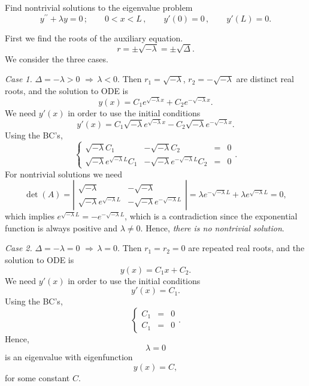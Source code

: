 \documentclass[11pt]{article}
\begin{document}
\begin{problem}
Find nontrivial solutions to the eigenvalue problem
\begin{equation*}
y^{\prime \prime} + \lambda y =0\,; \qquad  0<x<L \,, \qquad y'(0)=0  \,,\qquad y'(L) =0. 
\end{equation*}
\end{problem}
\begin{solution}
First we find the roots of the auxiliary equation.
\[r=\pm\sqrt{-\lambda}=\pm\sqrt{\Delta}.\]
We consider the three cases.\\

\par \textsl{Case 1.} $\Delta = -\lambda >0 \,\, \Rightarrow \, \lambda<0.$ Then $r_{1}=\sqrt{-\lambda}$, $r_{2}=-\sqrt{-\lambda}$ are distinct real roots, and the solution to ODE is
\[y(x)=C_{1}e^{\sqrt{-\lambda}x}+C_{2}e^{-\sqrt{-\lambda}x}.\]
We need $y'(x)$ in order to use the initial conditions
\[y'(x)=C_{1}\sqrt{-\lambda}e^{\sqrt{-\lambda}x}-C_{2}\sqrt{-\lambda}e^{-\sqrt{-\lambda}x}.\]
Using the BC's,
\begin{equation*}
\left\{\begin{array}{rrcc}
       \sqrt{-\lambda}C_{1} & - \sqrt{-\lambda}C_{2}&=&0\\
       \sqrt{-\lambda}e^{\sqrt{-\lambda}L}C_{1} &- \sqrt{-\lambda}e^{-\sqrt{-\lambda}L}C_{2}&=&0
      \end{array}\right. .
\end{equation*}
For nontrivial solutions we need 
$$\det(A)=\left|\begin{matrix} \sqrt{-\lambda} & - \sqrt{-\lambda}\\ \sqrt{-\lambda}e^{\sqrt{-\lambda}L} & -\sqrt{-\lambda}e^{-\sqrt{-\lambda}L}\end{matrix}\right|=\lambda e^{-\sqrt{-\lambda}L} + \lambda e^{\sqrt{-\lambda}L}=0,$$ 
which implies $e^{\sqrt{-\lambda}L}=-e^{-\sqrt{-\lambda}L}$, which is a contradiction since the exponential function is always positive and $\lambda\neq 0$. Hence, \textsl{there is no nontrivial solution}.

\par \textsl{Case 2.} $\Delta = -\lambda =0 \,\, \Rightarrow \, \lambda=0.$ Then $r_{1}=r_{2}=0$ are repeated real roots, and the solution to ODE is
\[y(x)=C_{1}x+C_{2}.\]
We need $y'(x)$ in order to use the initial conditions
\[y'(x)=C_{1}.\]
Using the BC's,
\begin{equation*}
\left\{\begin{array}{rcc}
       C_{1} & = &0\\
       C_{1} & = &0
      \end{array}\right. .
\end{equation*}
Hence, \[\boxed{\lambda=0}\] is an eigenvalue with eigenfunction \[\boxed{y(x)=C},\]
for some constant $C$.


\end{solution}
\end{document}
